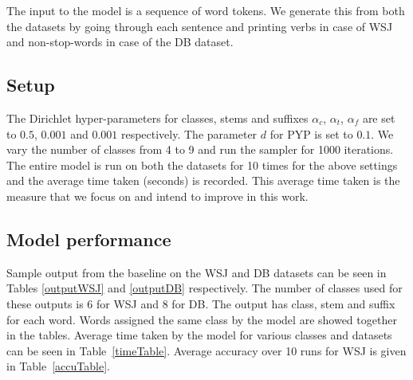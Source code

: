 \documentclass{article}
\begin{document}
The input to the model is a sequence of word tokens. We generate this 
from both the datasets by going through each sentence and printing verbs 
in case of WSJ and non-stop-words in case of the DB dataset.

\subsection{Setup}

The Dirichlet hyper-parameters for classes, stems and suffixes 
$\alpha_{c}$, $\alpha_{t}$, $\alpha_{f}$ are set to 
$0.5$, $0.001$ and $0.001$ respectively. The parameter $d$ for PYP is set 
to $0.1$.
We vary the number of classes from 4 to 9 and run the sampler for 1000 
iterations. The entire model is run on both the datasets for 10 times 
for the above settings and the average time taken (seconds) is recorded.
This average time taken is the measure that we focus on and intend to 
improve in this work.

\subsection{Model performance}

Sample output from the baseline on the WSJ and DB datasets can be seen 
in Tables \ref{outputWSJ} and \ref{outputDB} respectively. The number 
of classes used for these outputs is 6 for WSJ and 8 for DB. The output
 has class, stem and suffix for each word. Words assigned the same class
 by the model are showed together in the tables. Average time taken by 
the model for various classes and datasets can be seen in 
Table~\ref{timeTable}. Average accuracy over 10 runs for WSJ is given 
in Table~\ref{accuTable}.
\end{document}
